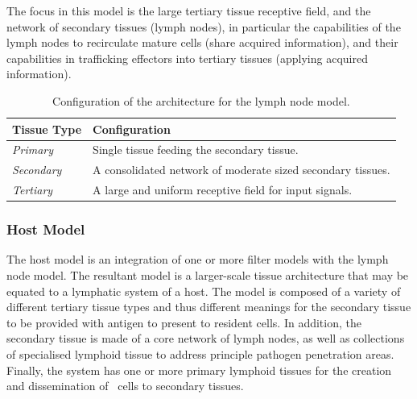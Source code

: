 The focus in this model is the large tertiary tissue receptive field, and the network of secondary tissues (lymph nodes), in particular the capabilities of the lymph nodes to recirculate mature cells (share acquired information), and their capabilities in trafficking effectors into tertiary tissues (applying acquired information).

\begin{table}[ht]
	\centering\small
		\begin{tabularx}{\textwidth}{lX}
		\toprule
		\textbf{Tissue Type} & \textbf{Configuration} \\ 
		\toprule
		\emph{Primary} & Single tissue feeding the secondary tissue. \\ 
		\emph{Secondary} & A consolidated network of moderate sized secondary tissues.  \\ 
		\emph{Tertiary} & A large and uniform receptive field for input signals.  \\ 
		\bottomrule
		\end{tabularx}		
	\caption{Configuration of the architecture for the lymph node model.}
	\label{tab:tissue:architectures:lymphnode}
\end{table}

%
%
\subsubsection{Host Model}
The host model is an integration of one or more filter models with the lymph node model. The resultant model is a larger-scale tissue architecture that may be equated to a lymphatic system of a host. The model is composed of a variety of different tertiary tissue types and thus different meanings for the secondary tissue to be provided with antigen to present to resident cells. In addition, the secondary tissue is made of a core network of lymph nodes, as well as collections of specialised lymphoid tissue to address principle pathogen penetration areas. Finally, the system has one or more primary lymphoid tissues for the creation and dissemination of \naive\ cells to secondary tissues.

